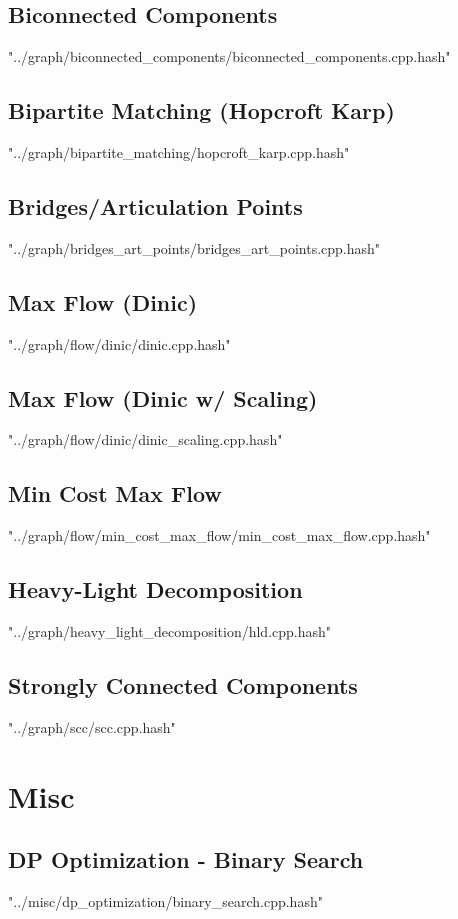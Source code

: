\documentclass [12pt,onecolumn,oneside]{article}
\begin{document}
\subsection{ Biconnected Components}
 {"../graph/biconnected_components/biconnected_components.cpp.hash"}
\subsection{ Bipartite Matching (Hopcroft Karp)}
 {"../graph/bipartite_matching/hopcroft_karp.cpp.hash"}
\subsection{ Bridges/Articulation Points}
 {"../graph/bridges_art_points/bridges_art_points.cpp.hash"}
\subsection{ Max Flow (Dinic)}
 {"../graph/flow/dinic/dinic.cpp.hash"}
\subsection{ Max Flow (Dinic w/ Scaling)}
 {"../graph/flow/dinic/dinic_scaling.cpp.hash"}
\subsection{ Min Cost Max Flow}
 {"../graph/flow/min_cost_max_flow/min_cost_max_flow.cpp.hash"}
\subsection{ Heavy-Light Decomposition}
 {"../graph/heavy_light_decomposition/hld.cpp.hash"}
\subsection{ Strongly Connected Components}
 {"../graph/scc/scc.cpp.hash"}
\newpage

\section{Misc}
\subsection{ DP Optimization - Binary Search}
 {"../misc/dp_optimization/binary_search.cpp.hash"}
\end{document}
